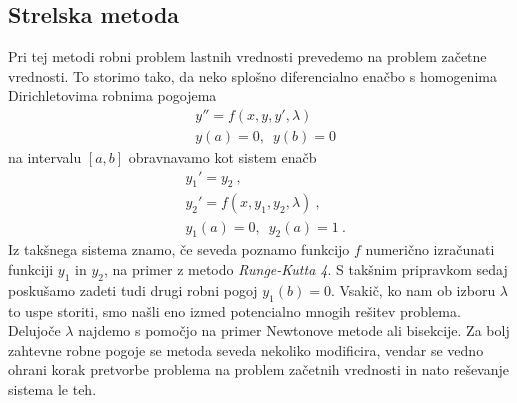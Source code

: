 \documentclass{porocilo}
\begin{document}
\subsection{Strelska metoda}
Pri tej metodi robni problem lastnih vrednosti prevedemo na problem začetne vrednosti. To storimo tako, da neko splošno diferencialno enačbo s homogenima Dirichletovima robnima pogojema
\begin{align*}
     & y'' = f(x, y, y', \lambda) \\
     & y(a) = 0,\enspace y(b) = 0
\end{align*}
na intervalu $[a, b]$ obravnavamo kot sistem enačb
\begin{align*}
     & y_1' = y_2\>,                      \\
     & y_2' = f(x, y_1, y_2, \lambda)\>,  \\
     & y_1(a) = 0,\enspace y_2(a) = 1 \>.
\end{align*}
Iz takšnega sistema znamo, če seveda poznamo funkcijo $f$ numerično izračunati funkciji $y_1$ in $y_2$, na primer z metodo \textit{Runge-Kutta 4}. S takšnim pripravkom sedaj poskušamo zadeti tudi drugi robni pogoj $y_1(b) = 0$. Vsakič, ko nam ob izboru $\lambda$ to uspe storiti, smo našli eno izmed potencialno mnogih rešitev problema. Delujoče $\lambda$ najdemo s pomočjo na primer Newtonove metode ali bisekcije. Za bolj zahtevne robne pogoje se metoda seveda nekoliko modificira, vendar se vedno ohrani korak pretvorbe problema na problem začetnih vrednosti in nato reševanje sistema le teh.
\end{document}
